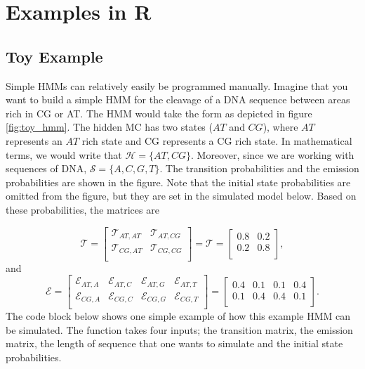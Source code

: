 \documentclass{article}\usepackage[]{graphicx}\usepackage[]{color}
\begin{document}
\section{Examples in R}

\subsection{Toy Example}

Simple HMMs can relatively easily be programmed manually. Imagine that you want to build a simple HMM for the cleavage of a DNA sequence between areas rich in CG or AT. The HMM would take the form as depicted in figure \ref{fig:toy_hmm}. The hidden MC has two states ($AT$ and $CG$), where $AT$ represents an $AT$ rich state and CG represents a CG rich state. In mathematical terms, we would write that $\mathcal{H} = \{AT, CG\}$. Moreover, since we are working with sequences of DNA, $\mathcal{S} = \{A,C,G,T\}$. The transition probabilities and the emission probabilities are shown in the figure. Note that the initial state probabilities are omitted from the figure, but they are set in the simulated model below. Based on these probabilities, the matrices are

\begin{equation*}
  \mathcal{T} = \begin{bmatrix}
      \mathcal{T}_{AT, AT} & \mathcal{T}_{AT, CG} \\
      \mathcal{T}_{CG, AT} & \mathcal{T}_{CG, CG}  \\
  \end{bmatrix} = \mathcal{T} = \begin{bmatrix}
      0.8 & 0.2 \\
      0.2 & 0.8  \\
  \end{bmatrix},
\end{equation*}
and 
\begin{equation*}
  \mathcal{E} = \begin{bmatrix}
      \mathcal{E}_{AT, A} & \mathcal{E}_{AT, C} & \mathcal{E}_{AT, G} & \mathcal{E}_{AT, T}\\
      \mathcal{E}_{CG, A} & \mathcal{E}_{CG, C} & \mathcal{E}_{CG, G} & \mathcal{E}_{CG, T}\\
  \end{bmatrix} = \begin{bmatrix}
     0.4 & 0.1 & 0.1 & 0.4 \\
      0.1 & 0.4 & 0.4 & 0.1 \\
  \end{bmatrix}.
\end{equation*}
The code block below shows one simple example of how this example HMM can be simulated. The function takes four inputs; the transition matrix, the emission matrix, the length of sequence that one wants to simulate and the initial state probabilities. 
\end{document}
